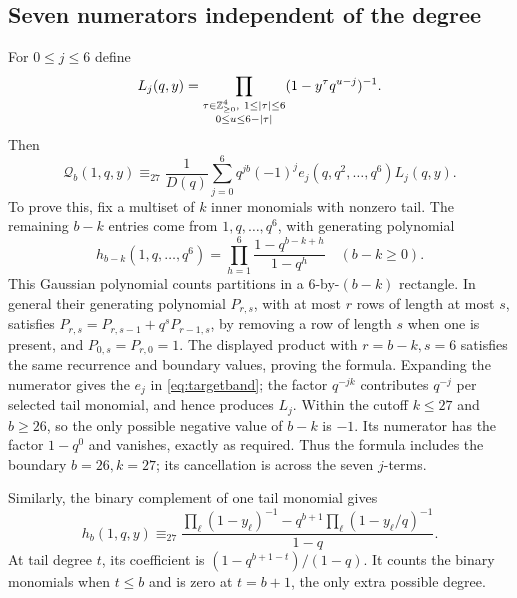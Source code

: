 \subsection{Seven numerators independent of the degree}
For \(0\le j\le6\) define
\[
 L_j(q,y)=
 \prod_{\substack{\tau\in\mathbb Z_{\ge0}^4,\ 1\le|\tau|\le6\\0\le u\le6-|\tau|}}
                         (1-y^\tau q^{u-j})^{-1}.
\]
Then
\begin{equation}\label{eq:targetband}
 \mathcal Q_b(1,q,y)\equiv_{27}
 \frac1{D(q)}\sum_{j=0}^6q^{jb}(-1)^j
                  e_j(q,q^2,\ldots,q^6)L_j(q,y).
\end{equation}
To prove this, fix a multiset of \(k\) inner monomials with nonzero tail.
The remaining \(b-k\) entries come from \(1,q,\ldots,q^6\), with
generating polynomial
\[
 h_{b-k}(1,q,\ldots,q^6)=
                    \prod_{h=1}^6\frac{1-q^{b-k+h}}{1-q^h}
                                      \quad(b-k\ge0).
\]
This Gaussian polynomial counts partitions in a \(6\)-by-\((b-k)\)
rectangle. In general their generating polynomial \(P_{r,s}\), with at
most \(r\) rows of length at most \(s\), satisfies
\(P_{r,s}=P_{r,s-1}+q^sP_{r-1,s}\), by removing a row of length \(s\)
when one is present, and \(P_{0,s}=P_{r,0}=1\).
The displayed product with \(r=b-k,s=6\) satisfies the same recurrence
and boundary values, proving the formula.
Expanding the numerator gives the \(e_j\) in \eqref{eq:targetband};
the factor \(q^{-jk}\) contributes \(q^{-j}\) per selected tail monomial,
and hence produces \(L_j\).
Within the cutoff \(k\le27\) and \(b\ge26\), so the only possible
negative value of \(b-k\) is \(-1\). Its numerator has the factor
\(1-q^0\) and vanishes, exactly as required. Thus the formula includes
the boundary \(b=26,k=27\); its cancellation is across the seven
\(j\)-terms.

Similarly, the binary complement of one tail monomial gives
\begin{equation}\label{eq:binarysource}
 h_b(1,q,y)\equiv_{27}
 \frac{\prod_\ell(1-y_\ell)^{-1}
       -q^{b+1}\prod_\ell(1-y_\ell/q)^{-1}}{1-q}.
\end{equation}
At tail degree \(t\), its coefficient is
\((1-q^{b+1-t})/(1-q)\). It counts the binary monomials when \(t\le b\)
and is zero at \(t=b+1\), the only extra possible degree.

